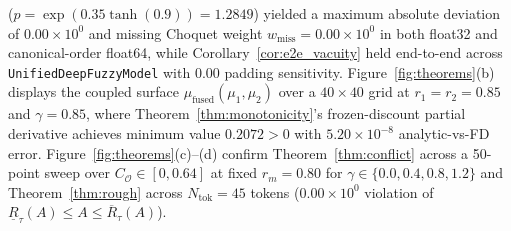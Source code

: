 \documentclass[10pt,twocolumn]{article}
\begin{document}
($p = \exp(0.35\tanh(0.9)) = 1.2849$) yielded a maximum absolute deviation of
$0.00 \times 10^0$ and missing Choquet weight $w_{\text{miss}} = 0.00 \times 10^0$ in both
float32 and canonical-order float64, while Corollary~\ref{cor:e2e_vacuity} held end-to-end
across \texttt{UnifiedDeepFuzzyModel} with $0.00$ padding sensitivity.
Figure~\ref{fig:theorems}(b) displays the coupled surface $\mu_{\text{fused}}(\mu_1, \mu_2)$
over a $40 \times 40$ grid at $r_1=r_2=0.85$ and $\gamma=0.85$, where
Theorem~\ref{thm:monotonicity}'s frozen-discount partial derivative achieves minimum value
$0.2072 > 0$ with $5.20 \times 10^{-8}$ analytic-vs-FD error.
Figure~\ref{fig:theorems}(c)--(d) confirm Theorem~\ref{thm:conflict} across a 50-point sweep
over $C_{\mathcal{O}} \in [0, 0.64]$ at fixed $r_m=0.80$ for $\gamma \in \{0.0, 0.4, 0.8,
1.2\}$ and Theorem~\ref{thm:rough} across $N_{\text{tok}}=45$ tokens ($0.00 \times 10^0$
violation of $\underline{R}_\tau(A) \le A \le \overline{R}_\tau(A)$).
\end{document}
